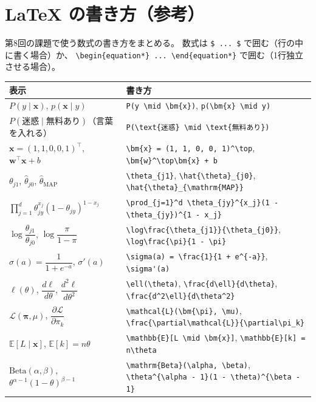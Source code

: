 \documentclass[a4paper,dvipdfmx]{jsarticle}
\newcommand{\提出期限}{2026年11月16日（月）}
\newcommand{\学籍番号}{0000000}
\newcommand{\氏名}{氏名を書く}
\newcommand{\提出日}{2026年11月16日}
\begin{document}
\newpage
\section*{LaTeX の書き方（参考）}

第8回の課題で使う数式の書き方をまとめる。
数式は \verb|$ ... $| で囲む（行の中に書く場合）か、
\verb|\begin{equation*} ... \end{equation*}| で囲む（1行独立させる場合）。

\begin{center}
\scriptsize
\begin{tabular}{l|l}
\hline
表示 & 書き方 \\
\hline\hline
$P(y \mid \bm{x})$, $p(\bm{x} \mid y)$ & \verb|P(y \mid \bm{x})|, \verb|p(\bm{x} \mid y)| \\
$P(\text{迷惑} \mid \text{無料あり})$（言葉を入れる） & \verb|P(\text{迷惑} \mid \text{無料あり})| \\
$\bm{x} = (1, 1, 0, 0, 1)^\top$, $\bm{w}^\top\bm{x} + b$ & \verb|\bm{x} = (1, 1, 0, 0, 1)^\top|, \verb|\bm{w}^\top\bm{x} + b| \\
$\theta_{j1}$, $\hat{\theta}_{j0}$, $\hat{\theta}_{\mathrm{MAP}}$ & \verb|\theta_{j1}|, \verb|\hat{\theta}_{j0}|, \verb|\hat{\theta}_{\mathrm{MAP}}| \\
$\prod_{j=1}^d \theta_{jy}^{x_j}(1 - \theta_{jy})^{1 - x_j}$ & \verb|\prod_{j=1}^d \theta_{jy}^{x_j}(1 - \theta_{jy})^{1 - x_j}| \\
$\log\dfrac{\theta_{j1}}{\theta_{j0}}$, $\log\dfrac{\pi}{1 - \pi}$ & \verb|\log\frac{\theta_{j1}}{\theta_{j0}}|, \verb|\log\frac{\pi}{1 - \pi}| \\
$\sigma(a) = \dfrac{1}{1 + e^{-a}}$, $\sigma'(a)$ & \verb|\sigma(a) = \frac{1}{1 + e^{-a}}|, \verb|\sigma'(a)| \\
$\ell(\theta)$, $\dfrac{d\ell}{d\theta}$, $\dfrac{d^2\ell}{d\theta^2}$ & \verb|\ell(\theta)|, \verb|\frac{d\ell}{d\theta}|, \verb|\frac{d^2\ell}{d\theta^2}| \\
$\mathcal{L}(\bm{\pi}, \mu)$, $\dfrac{\partial\mathcal{L}}{\partial\pi_k}$ & \verb|\mathcal{L}(\bm{\pi}, \mu)|, \verb|\frac{\partial\mathcal{L}}{\partial\pi_k}| \\
$\mathbb{E}[L \mid \bm{x}]$, $\mathbb{E}[k] = n\theta$ & \verb|\mathbb{E}[L \mid \bm{x}]|, \verb|\mathbb{E}[k] = n\theta| \\
$\mathrm{Beta}(\alpha, \beta)$, $\theta^{\alpha - 1}(1 - \theta)^{\beta - 1}$ & \verb|\mathrm{Beta}(\alpha, \beta)|, \verb|\theta^{\alpha - 1}(1 - \theta)^{\beta - 1}| \\

\end{tabular}
\end{center}
\end{document}
